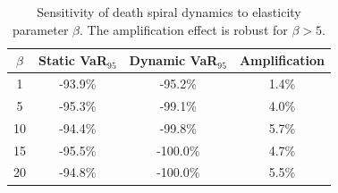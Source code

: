 \begin{table}[t]
\centering
\footnotesize
\begin{tabular}{c c c c}
\hline
$\beta$ & Static VaR$_{95}$ & Dynamic VaR$_{95}$ & Amplification \\
\hline
1 & -93.9\% & -95.2\% & 1.4\% \\
5 & -95.3\% & -99.1\% & 4.0\% \\
10 & -94.4\% & -99.8\% & 5.7\% \\
15 & -95.5\% & -100.0\% & 4.7\% \\
20 & -94.8\% & -100.0\% & 5.5\% \\
\hline
\end{tabular}
\caption{Sensitivity of death spiral dynamics to elasticity parameter $\beta$. The amplification effect is robust for $\beta > 5$.}
\label{tab:sensitivity_elasticity}
\end{table}
